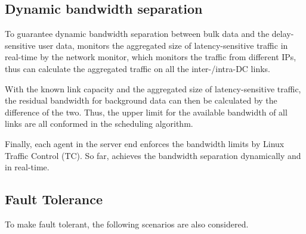 \subsection{Dynamic bandwidth separation}
\label{subsec:system:separation}

To guarantee dynamic bandwidth separation between bulk data and the delay-sensitive user data, \name monitors the aggregated size of latency-sensitive traffic in real-time by the network monitor, which monitors the traffic from different IPs, thus can calculate the aggregated traffic on all the inter-/intra-DC links.

With the known link capacity and the aggregated size of latency-sensitive traffic, the residual bandwidth for background data can then be calculated by the difference of the two. Thus, the upper limit for the available bandwidth of all links are all conformed in the scheduling algorithm.

Finally, each agent in the server end enforces the bandwidth limits by Linux Traffic Control (TC). So far, \name achieves the bandwidth separation dynamically and in real-time.



\subsection{Fault Tolerance}
\label{subsec:system:fault}
To make \name fault tolerant, the following scenarios are also considered.

